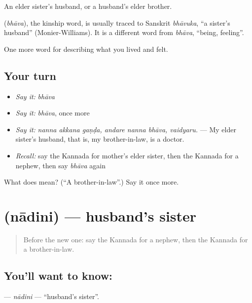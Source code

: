 An elder sister's husband, or a husband's elder brother.

\begin{cousinweb}
\textbf{} (\emph{bhāva}), the kinship word, is usually traced to Sanskrit \emph{bhāvuka}, \textquotedblleft{}a sister's husband\textquotedblright{} (Monier-Williams). It is a different word from \emph{bhāva}, \textquotedblleft{}being, feeling\textquotedblright{}.
\end{cousinweb}

\begin{grammarlens}[title={What you've built}]
One more word for describing what you lived and felt.
\end{grammarlens}

\subsection*{Your turn}
\begin{itemize}
\raggedright
  \item \emph{Say it:} \emph{bhāva}
  \item \emph{Say it:} \emph{bhāva}, once more
  \item \emph{Say it:} \emph{nanna akkana gaṇḍa, andare nanna bhāva, vaidyaru.} — My elder sister's husband, that is, my brother-in-law, is a doctor.
  \item \emph{Recall:} say the Kannada for mother's elder sister, then the Kannada for a nephew, then say \emph{bhāva} again
\end{itemize}

\begin{tcolorbox}[breakable,colback=teal!4,colframe=teal!35!black,title={Before you move on}]
What does  mean? (\textquotedblleft{}A brother-in-law\textquotedblright{}.) Say it once more.
\end{tcolorbox}
\section[\texorpdfstring{\kn{ನಾದಿನಿ} (nādini)}{ನಾದಿನಿ (nādini)}]{ (nādini) — husband's sister}

\label{lesson:KA-C525-nadini}



\begin{quote}
Before the new one: say the Kannada for a nephew, then the Kannada for a brother-in-law.
\end{quote}

\subsection*{You'll want to know: }
\textbf{} — \emph{nādini} — \textquotedblleft{}husband's sister\textquotedblright{}.

